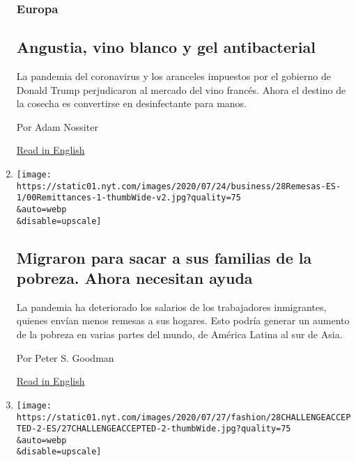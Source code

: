 \begin{enumerate}
  \hypertarget{europa}{%
  \subsubsection{Europa}\label{europa}}

  \hypertarget{angustia-vino-blanco-y-gel-antibacterial}{%
  \subsection{Angustia, vino blanco y gel
  antibacterial}\label{angustia-vino-blanco-y-gel-antibacterial}}

  La pandemia del coronavirus y los aranceles impuestos por el gobierno
  de Donald Trump perjudicaron al mercado del vino francés. Ahora el
  destino de la cosecha es convertirse en desinfectante para manos.

  Por Adam Nossiter

  \href{https://www.nytimes.com/2020/07/27/world/europe/france-alsace-wine-coronavirus.html}{Read
  in English}
\item
  \href{/es/2020/07/28/espanol/mundo/remesas-coronavirus.html}{}

  \texttt{[image: https://static01.nyt.com/images/2020/07/24/business/28Remesas-ES-1/00Remittances-1-thumbWide-v2.jpg?quality=75\\\&auto=webp\\\&disable=upscale]}

  \hypertarget{migraron-para-sacar-a-sus-familias-de-la-pobreza-ahora-necesitan-ayuda}{%
  \subsection{Migraron para sacar a sus familias de la pobreza. Ahora
  necesitan
  ayuda}\label{migraron-para-sacar-a-sus-familias-de-la-pobreza-ahora-necesitan-ayuda}}

  La pandemia ha deteriorado los salarios de los trabajadores
  inmigrantes, quienes envían menos remesas a sus hogares. Esto podría
  generar un aumento de la pobreza en varias partes del mundo, de
  América Latina al sur de Asia.

  Por Peter S. Goodman

  \href{https://www.nytimes.com/2020/07/27/business/global-remittances-coronavirus.html}{Read
  in English}
\item
  \href{/es/2020/07/28/espanol/estilos-de-vida/reto-selfi-blanco-negro.html}{}

  \texttt{[image: https://static01.nyt.com/images/2020/07/27/fashion/28CHALLENGEACCEPTED-2-ES/27CHALLENGEACCEPTED-2-thumbWide.jpg?quality=75\\\&auto=webp\\\&disable=upscale]}


\end{enumerate}
